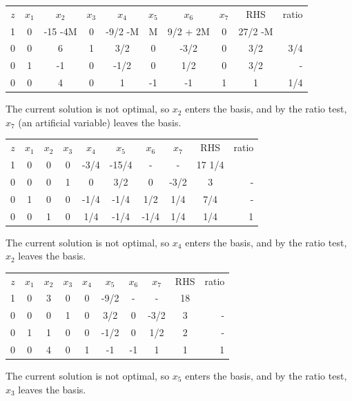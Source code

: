 \begin{center} \begin{tabular} {|c|c|c|c|c|c|c|c||c| r} \cline{1-9}
$z$	&   $x_1$ & $x_2$   & $x_3$	& $x_4$	& $x_5$	& $x_6$	   & $x_7$	& RHS      & ratio \\
\cline{1-9}
1	&     0   & -15 -4M &	 0 & -9/2 -M &	  M & 9/2 + 2M &	  0 &  27/2 -M &    	\\
0	&	  0   &	     6  &	 1 &	 3/2 &	  0 &	    -3/2 &	  0 &	3/2    & 3/4     \\
0	&	  1   &	    -1  &	 0 &	-1/2 &	  0 &	   1/2 &	  0 &	3/2    & -  	\\
0	&	  0   &	     4  &	 0 &	   1 &	 -1 &	     -1 &	  1 &	  1    & 1/4        	\\ \cline{1-9}
\end{tabular} \end{center}
\noindent The current solution is not optimal, so $x_2$ enters the basis, and by the ratio test, $x_7$ (an artificial variable) leaves the basis.

\begin{center} \begin{tabular} {|c|c|c|c|c|c|c|c||c|r} \cline{1-9}
$z$	&   $x_1$ & $x_2$ & $x_3$ & $x_4$	& $x_5$	& $x_6$	   & $x_7$	& RHS     &	ratio \\
\cline{1-9}
1	&     0   &     0 &	 0    & -3/4    & -15/4 &        - &	  - &  17 1/4 &	   \\
0	&	  0   &	    0 &	 1    &	   0    &	3/2 &	     0 &   -3/2 &	  3   &	-  \\
0	&	  1   &	    0 &	 0    &	-1/4    &  -1/4 &	   1/2 &	1/4 &	  7/4 &	-  	\\
0	&	  0   &	    1 &	 0    &	 1/4    &  -1/4 &	  -1/4 &	1/4 &	  1/4 & 1   \\
\cline{1-9}
\end{tabular} \end{center}
\noindent The current solution is not optimal, so $x_4$ enters the basis, and by the ratio test, $x_2$ leaves the basis.

\begin{center} \begin{tabular} {|c|c|c|c|c|c|c|c||c|r} \cline{1-9}
$z$	&   $x_1$ & $x_2$ & $x_3$ & $x_4$ & $x_5$ & $x_6$ & $x_7$ & RHS     &	ratio \\
\cline{1-9}
1	&     0   &    3  &	 0    & 0     & -9/2  &     - &	    - &  18 &	   \\
0	&	  0   &	    0 &	 1    &	   0  &	  3/2 &	    0 &  -3/2 &	  3     &	-  \\
0	&	  1   &	    1 &	 0    &	0     &  -1/2 &	   0  &	  1/2 &	  2   &	-  	\\
0	&	  0   &	    4 &	 0    &	 1    &  -1   &	  -1 &      1 &	  1    & 1   \\ \cline{1-9}
\end{tabular} \end{center}
\noindent The current solution is not optimal, so $x_5$ enters the basis, and by the ratio test, $x_3$ leaves the basis.

